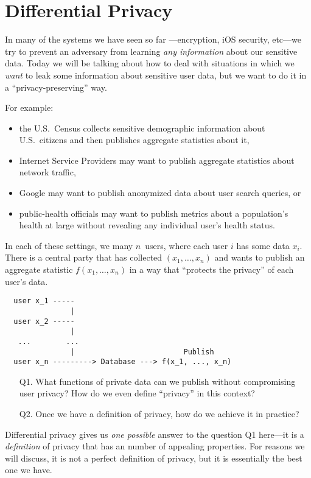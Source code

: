\chapter{Differential Privacy}

In many of the systems we have seen so far%
---encryption, iOS security, etc---we try to prevent
an adversary from learning \emph{any information} about
our sensitive data.
Today we will be talking about how to deal with situations
in which we \emph{want} to leak some information about
sensitive user data, but we want to do it in a ``privacy-preserving''
way.

For example:
\begin{itemize}
  \item the U.S.~Census collects sensitive demographic information about U.S.~citizens
    and then publishes aggregate statistics about it,
  \item Internet Service Providers may want to publish aggregate statistics about
        network traffic,
  \item Google may want to publish anonymized data about user search queries, or
  \item public-health officials may want to publish metrics about a population's
        health at large without revealing any individual user's health status.
\end{itemize}

In each of these settings, we many $n$~users, 
where each user $i$ has some data $x_i$.
There is a central party that has collected
$(x_1, \dots, x_n)$ and wants to publish
an aggregate statistic $f(x_1, \dots, x_n)$
in a way that ``protects the privacy'' of
each user's data.
\begin{verbatim}
  user x_1 -----
               |
  user x_2 -----
               |
   ...        ...                        
               |                         Publish
  user x_n ---------> Database ---> f(x_1, ..., x_n)
\end{verbatim}

\begin{itemize}
\item[Q1.] What functions of private data can we publish without
        compromising user privacy? How do we even define ``privacy'' 
        in this context?
      \item[Q2.] Once we have a definition of privacy, how do we achieve it
        in practice?
\end{itemize}
Differential privacy gives us \emph{one possible} answer to the 
question Q1 here---it is a \emph{definition} of privacy that has an number
of appealing properties.
For reasons we will discuss, it is not a perfect definition of privacy,
but it is essentially the best one we have.

